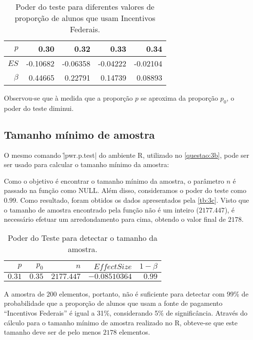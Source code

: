 \begin{table}[ht]
\centering
\caption{Poder do teste para diferentes valores de proporção de alunos que usam Incentivos Federais.} 
\label{tb:3b}
\begin{tabular}{rrrrr}
  \toprule
 $p$ & 0.30 & 0.32 & 0.33 & 0.34 \\ 
  \midrule
$ES$ 	& -0.10682 & -0.06358 & -0.04222 & -0.02104 \\ 
$\beta$ & 0.44665   & 0.22791   & 0.14739   & 0.08893  \\ 
   \bottomrule
\end{tabular}
\end{table}

Observou-se que à medida que a proporção $p$ se aproxima da proporção $p_0$, o poder do teste diminui.


\subsection{Tamanho mínimo de amostra}
\label{questao:3c}
O mesmo comando \r|pwr.p.test| do ambiente R, utilizado no \autoref{questao:3b}, pode ser ser usado para calcular o tamanho mínimo da amostra: 


Como o objetivo é encontrar o tamanho mínimo da amostra, o parâmetro $n$ é passado na função como NULL. Além disso, consideramos o poder do teste como $0.99$.
Como resultado, foram obtidos os dados apresentados pela \autoref{tb:3c}. 
Visto que o tamanho de amostra encontrado pela função não é um inteiro ($2177.447$), é necessário efetuar um arredondamento para cima, obtendo o valor final de $2178$.

\begin{table}[ht]
\centering
\caption{Poder do Teste para detectar o tamanho da amostra.} 
\label{tb:3c}
\begin{tabular}{rrrrr}
  \toprule
 $p$ & $p_0$ & $n$ & $Effect Size$ & $1 - \beta$ \\ 
  \midrule
  $0.31$ & $0.35$ & $2177.447$ & $-0.08510364$ & $0.99$ \\ 
   \bottomrule
\end{tabular}
\end{table}

A amostra de $200$ elementos, portanto, não é suficiente para detectar com 99\% de probabilidade que a proporção
de alunos que usam a fonte de pagamento ``Incentivos Federais'' é igual a 31\%, considerando 5\% de significância.
Através do cálculo para o tamanho mínimo de amostra realizado no R, 
obteve-se que este tamanho deve ser de pelo menos $2178$ elementos.

